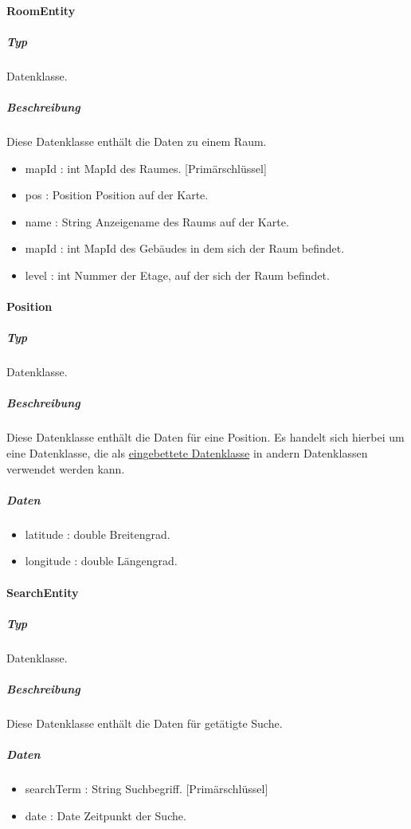 \paragraph{RoomEntity}
\subparagraph*{Typ}
Datenklasse.
\subparagraph*{Beschreibung}
Diese Datenklasse enthält die Daten zu einem Raum.
\begin{itemize}
    \item mapId : int MapId des Raumes. [Primärschlüssel]
    \item pos : Position Position auf der Karte.
    \item name : String Anzeigename des Raums auf der Karte.
    \item mapId : int MapId des Gebäudes in dem sich der Raum befindet.
    \item level : int Nummer der Etage, auf der sich der Raum befindet.
\end{itemize}

\paragraph{Position}
\subparagraph*{Typ}
Datenklasse.
\subparagraph*{Beschreibung}
Diese Datenklasse enthält die Daten für eine Position.
Es handelt sich hierbei um eine Datenklasse, die als \href{https://developer.android.com/reference/android/arch/persistence/room/Embedded}
{eingebettete Datenklasse} in andern Datenklassen verwendet werden kann. 
\subparagraph*{Daten}
\begin{itemize}
    \item latitude : double Breitengrad.
    \item longitude : double Längengrad.
\end{itemize}

\paragraph{SearchEntity}
\subparagraph*{Typ}
Datenklasse.
\subparagraph*{Beschreibung}
Diese Datenklasse enthält die Daten für getätigte Suche.
\subparagraph*{Daten}
\begin{itemize}
    \item searchTerm : String Suchbegriff. [Primärschlüssel]
    \item date : Date Zeitpunkt der Suche.
\end{itemize}